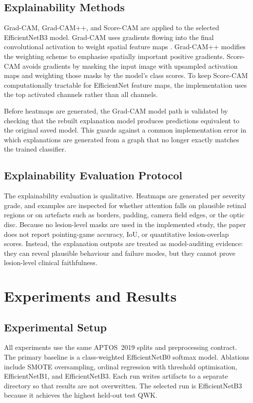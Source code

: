 \documentclass[11pt,a4paper]{article}
\begin{document}
\subsection{Explainability Methods}
Grad-CAM, Grad-CAM++, and Score-CAM are applied to the selected EfficientNetB3 model. Grad-CAM uses gradients flowing into the final convolutional activation to weight spatial feature maps \cite{gradcam}. Grad-CAM++ modifies the weighting scheme to emphasise spatially important positive gradients. Score-CAM avoids gradients by masking the input image with upsampled activation maps and weighting those masks by the model's class scores. To keep Score-CAM computationally tractable for EfficientNet feature maps, the implementation uses the top activated channels rather than all channels.

Before heatmaps are generated, the Grad-CAM model path is validated by checking that the rebuilt explanation model produces predictions equivalent to the original saved model. This guards against a common implementation error in which explanations are generated from a graph that no longer exactly matches the trained classifier.

\subsection{Explainability Evaluation Protocol}
The explainability evaluation is qualitative. Heatmaps are generated per severity grade, and examples are inspected for whether attention falls on plausible retinal regions or on artefacts such as borders, padding, camera field edges, or the optic disc. Because no lesion-level masks are used in the implemented study, the paper does not report pointing-game accuracy, IoU, or quantitative lesion-overlap scores. Instead, the explanation outputs are treated as model-auditing evidence: they can reveal plausible behaviour and failure modes, but they cannot prove lesion-level clinical faithfulness.

\section{Experiments and Results}
\subsection{Experimental Setup}
All experiments use the same APTOS~2019 splits and preprocessing contract. The primary baseline is a class-weighted EfficientNetB0 softmax model. Ablations include SMOTE oversampling, ordinal regression with threshold optimisation, EfficientNetB1, and EfficientNetB3. Each run writes artifacts to a separate directory so that results are not overwritten. The selected run is EfficientNetB3 because it achieves the highest held-out test QWK.
\end{document}
